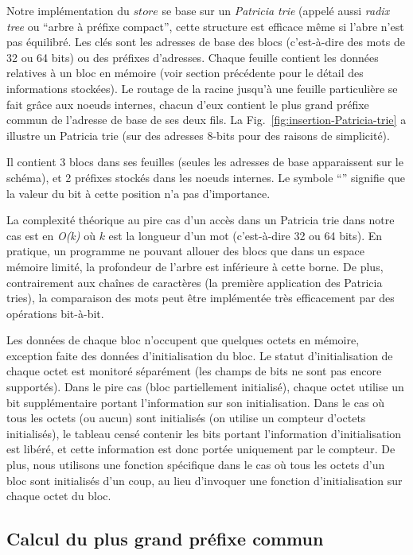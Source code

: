 Notre implémentation du $store$ se base sur un {\em Patricia trie}
\cite{Patricia-tries} (appelé aussi {\em radix tree} ou ``arbre à préfixe
compact'', cette structure est efficace même si l'abre n'est pas équilibré.
Les clés sont les adresses de base des blocs (c'est-à-dire des mots de 32 ou 64
bits) ou des préfixes d'adresses. Chaque feuille contient les données relatives
à un bloc en mémoire (voir section précédente pour le détail des informations
stockées). Le routage de la racine jusqu'à une feuille particulière se fait
grâce aux noeuds internes, chacun d'eux contient le plus grand préfixe commun
de l'adresse de base de ses deux fils. La Fig.~\ref{fig:insertion-Patricia-trie}
a illustre un Patricia trie (sur des adresses 8-bits pour des raisons de
simplicité).

Il contient 3 blocs dans ses feuilles (seules les adresses de base apparaissent
sur le schéma), et 2 préfixes stockés dans les noeuds internes. Le symbole
``{\tt *}'' signifie que la valeur du bit à cette position n'a pas d'importance.

La complexité théorique au pire cas d'un accès dans un Patricia trie dans notre
cas est en {\em O(k)} où $k$ est la longueur d'un mot (c'est-à-dire 32 ou 64
bits). En pratique, un programme ne pouvant allouer des blocs que dans un
espace mémoire limité, la profondeur de l'arbre est inférieure à cette borne.
De plus, contrairement aux chaînes de caractères (la première application des
Patricia tries), la comparaison des mots peut être implémentée très
efficacement par des opérations bit-à-bit.

Les données de chaque bloc n'occupent que quelques octets en mémoire, exception
faite des données d'initialisation du bloc. Le statut d'initialisation de chaque
octet est monitoré séparément
(les champs de bits ne sont pas encore supportés). Dans le pire cas (bloc
partiellement initialisé), chaque octet utilise un bit supplémentaire portant
l'information sur son initialisation. Dans le cas où tous les octets (ou aucun)
sont initialisés (on utilise un compteur d'octets initialisés), le tableau
censé contenir les bits portant l'information d'initialisation est libéré, et
cette information est donc portée uniquement par le compteur. De plus, nous
utilisons une fonction spécifique dans le cas où tous les octets d'un bloc sont
initialisés d'un coup, au lieu d'invoquer une fonction d'initialisation sur
chaque octet du bloc.


\subsection{Calcul du plus grand préfixe commun}


